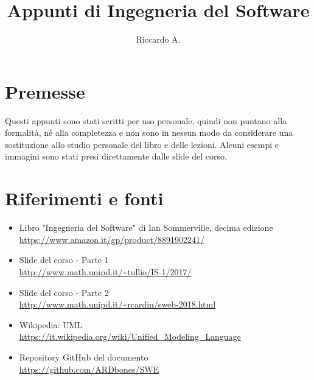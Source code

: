 

\author{Riccardo A.}
\title{Appunti di Ingegneria del Software}



\maketitle

\section*{Premesse}
Questi appunti sono stati scritti per uso personale, quindi non puntano alla formalità, né alla completezza e non sono in nessun modo da considerare una sostituzione allo studio personale del libro e delle lezioni. 
Alcuni esempi e immagini sono stati presi direttamente dalle slide del corso.

\section*{Riferimenti e fonti}
\begin{itemize}
\item Libro "Ingegneria del Software" di Ian Sommerville, decima edizione\\
\url{https://www.amazon.it/gp/product/8891902241/}
\item Slide del corso - Parte 1 \\
\url{http://www.math.unipd.it/~tullio/IS-1/2017/}
\item Slide del corso - Parte 2 \\
\url{http://www.math.unipd.it/~rcardin/sweb-2018.html}
\item Wikipedia: UML \\
\url{https://it.wikipedia.org/wiki/Unified_Modeling_Language}
\item Repository GitHub del documento \\
\url{https://github.com/ARDbones/SWE}
\end{itemize}

\tableofcontents
\newpage



